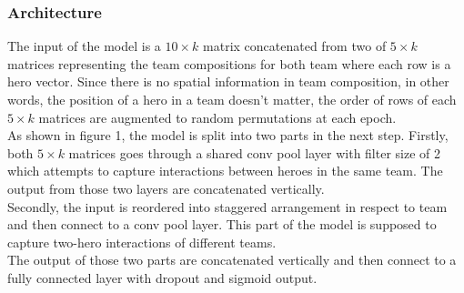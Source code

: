 \documentclass[a4paper, 10pt, conference]{ieeeconf}
\begin{document}
\subsubsection{Architecture}

The input of the model is a $10\times k$ matrix concatenated from two of $5\times k$ matrices representing the team compositions for both team where each row is a hero vector. Since there is no spatial information in team composition, in other words, the position of a hero in a team doesn't matter, the order of rows of each $5\times k$ matrices are augmented to random permutations at each epoch. \\

As shown in figure 1, the model is split into two parts in the next step. Firstly, both $5\times k$ matrices goes through a shared conv pool layer with filter size of 2 which attempts to capture interactions between heroes in the same team. The output from those two layers are concatenated vertically.\\

Secondly, the input is reordered into staggered arrangement in respect to team and then connect to a conv pool layer. This part of the model is supposed to capture two-hero interactions of different teams.\\

The output of those two parts are concatenated vertically and then connect to a fully connected layer with dropout and sigmoid output.
\end{document}
